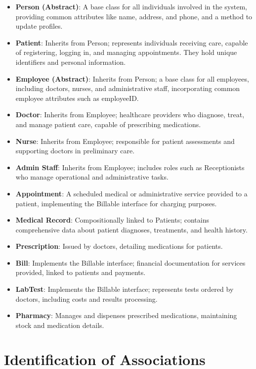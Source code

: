 \documentclass[12pt]{article}
\begin{document}
\begin{itemize}
  \item \textbf{Person (Abstract)}: A base class for all individuals involved in the system, providing common attributes like name, address, and phone, and a method to update profiles.
  \item \textbf{Patient}: Inherits from Person; represents individuals receiving care, capable of registering, logging in, and managing appointments. They hold unique identifiers and personal information.
  \item \textbf{Employee (Abstract)}: Inherits from Person; a base class for all employees, including doctors, nurses, and administrative staff, incorporating common employee attributes such as employeeID.
  \item \textbf{Doctor}: Inherits from Employee; healthcare providers who diagnose, treat, and manage patient care, capable of prescribing medications.
  \item \textbf{Nurse}: Inherits from Employee; responsible for patient assessments and supporting doctors in preliminary care.
  \item \textbf{Admin Staff}: Inherits from Employee; includes roles such as Receptionists who manage operational and administrative tasks.
  \item \textbf{Appointment}: A scheduled medical or administrative service provided to a patient, implementing the Billable interface for charging purposes.
  \item \textbf{Medical Record}: Compositionally linked to Patients; contains comprehensive data about patient diagnoses, treatments, and health history.
  \item \textbf{Prescription}: Issued by doctors, detailing medications for patients.
  \item \textbf{Bill}: Implements the Billable interface; financial documentation for services provided, linked to patients and payments.
  \item \textbf{LabTest}: Implements the Billable interface; represents tests ordered by doctors, including costs and results processing.
  \item \textbf{Pharmacy}: Manages and dispenses prescribed medications, maintaining stock and medication details.
\end{itemize}

\section*{Identification of Associations}
\end{document}
